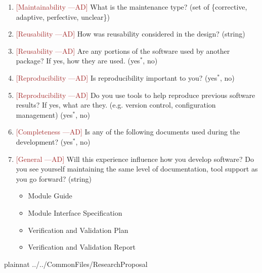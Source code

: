 \documentclass[12pt]{article}
\newcommand{\authornote}[3]{\textcolor{#1}{[#3 ---#2]}}
\newcommand{\authornote}[3]{}
\newcommand{\ad}[1]{\authornote{brown}{AD}{#1}} %
\begin{document}
\begin{enumerate}
	(string)
	\item \ad{Maintainability} What is the maintenance type? (set of \{corrective,
	adaptive, perfective, unclear\})
	\item \ad{Reusability} How was reusability considered in the design? (string)
	\item \ad{Reusability} Are any portions of the software used by another package?
	If yes, how they are used. ({yes$^*$, no})
	\item \ad{Reproducibility} Is reproducibility important to you? ({yes$^*$, no})
	\item \ad{Reproducibility} Do you use tools to help reproduce previous software
	results? If yes, what are they. (e.g. version control, configuration
	management) ({yes$^*$, no})
	\item \ad{Completeness} Is any of the following documents used during the
	development? ({yes$^*$, no})
	\item \ad{General} Will this experience influence how you develop software? Do
	you see yourself maintaining the same level of documentation, tool support as
	you go forward? (string)
	\begin{itemize}
		\item Module Guide
		\item Module Interface Specification
		\item Verification and Validation Plan
		\item Verification and Validation Report
	\end{itemize}
\end{enumerate}

\newpage

 {plainnat}
 {../../CommonFiles/ResearchProposal}
\end{document}
